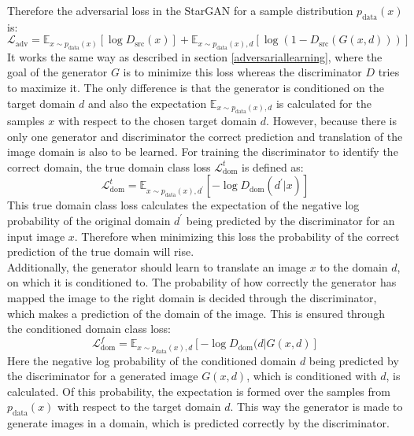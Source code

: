Therefore the adversarial loss in the StarGAN for a sample distribution $p_{\text{data}}(x)$ is:
\begin{equation}
    \mathcal{L}_{\text{adv}} = \mathbb{E}_{x\sim p_{\text{data}}(x)}[\log D_{\text{src}}(x)]+\mathbb{E}_{x\sim p_{\text{data}}(x), d}[\log(1-D_{\text{src}}(G(x, d)))]
    \label{adv_loss_star}
\end{equation}
It works the same way as described in section \ref{adversariallearning}, where the goal of the generator $G$ is to minimize this loss whereas the discriminator $D$ tries to maximize it. 
The only difference is that the generator is conditioned on the target domain $d$ and also the expectation $\mathbb{E}_{x\sim p_{\text{data}}(x), d}$ is calculated for the samples $x$ with respect to the chosen target domain $d$.
However, because there is only one generator and discriminator the correct prediction and translation of the image domain is also to be learned.
For training the discriminator to identify the correct domain, the true domain class loss $\mathcal{L}_{\text{dom}}^t$ is defined as:
\begin{equation}
    \mathcal{L}_{\text{dom}}^t = \mathbb{E}_{x\sim p_{\text{data}}(x), d^\prime}[-\log D_{\text{dom}}(d^\prime|x)]
    \label{loss_dom_true}
\end{equation}
This true domain class loss calculates the expectation of the negative log probability of the original domain $d^\prime$ being predicted by the discriminator for an input image $x$.
Therefore when minimizing this loss the probability of the correct prediction of the true domain will rise.\\
Additionally, the generator should learn to translate an image $x$ to the domain $d$, on which it is conditioned to.
The probability of how correctly the generator has mapped the image to the right domain is decided through the discriminator, which makes a prediction of the domain of the image. 
This is ensured through the conditioned domain class loss:
\begin{equation}
    \mathcal{L}_{\text{dom}}^f = \mathbb{E}_{x\sim p_{\text{data}}(x),d}[-\log D_{\text{dom}}(d|G(x,d)]
    \label{loss_dom_false}
\end{equation}
Here the negative log probability of the conditioned domain $d$ being predicted by the discriminator for a generated image $G(x,d)$, which is conditioned with $d$, is calculated.
Of this probability, the expectation is formed over the samples from $p_{\text{data}}(x)$ with respect to the target domain $d$.
This way the generator is made to generate images in a domain, which is predicted correctly by the discriminator.\\
